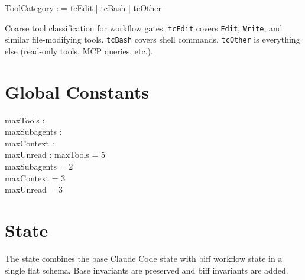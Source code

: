 \documentclass[a4paper,10pt,fleqn]{article}
\begin{document}
\begin{zed}
  ToolCategory ::= tcEdit | tcBash | tcOther
\end{zed}

Coarse tool classification for workflow gates. \texttt{tcEdit} covers
\texttt{Edit}, \texttt{Write}, and similar file-modifying tools.
\texttt{tcBash} covers shell commands. \texttt{tcOther} is everything
else (read-only tools, MCP queries, etc.).

\section{Global Constants}

\begin{axdef}
  maxTools : \nat \\
  maxSubagents : \nat \\
  maxContext : \nat \\
  maxUnread : \nat
  \where
  maxTools = 5 \\
  maxSubagents = 2 \\
  maxContext = 3 \\
  maxUnread = 3
\end{axdef}

\section{State}

The state combines the base Claude Code state with biff workflow
state in a single flat schema. Base invariants are preserved and
biff invariants are added.
\end{document}
